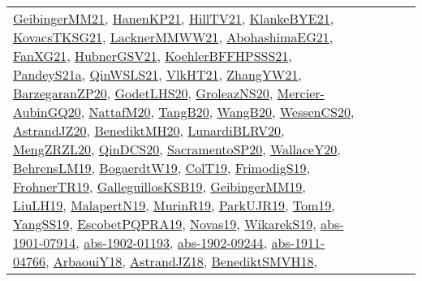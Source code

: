 {\begin{longtable}{lp{3cm}>{\raggedright}p{6cm}>{\raggedright}p{6cm}p{8cm}}
\href{papers/GeibingerMM21.pdf}{GeibingerMM21}\cite{GeibingerMM21}, \href{papers/HanenKP21.pdf}{HanenKP21}\cite{HanenKP21}, \href{papers/HillTV21.pdf}{HillTV21}\cite{HillTV21}, \href{papers/KlankeBYE21.pdf}{KlankeBYE21}\cite{KlankeBYE21}, \href{papers/KovacsTKSG21.pdf}{KovacsTKSG21}\cite{KovacsTKSG21}, \href{papers/LacknerMMWW21.pdf}{LacknerMMWW21}\cite{LacknerMMWW21}, \href{articles/AbohashimaEG21.pdf}{AbohashimaEG21}\cite{AbohashimaEG21}, \href{articles/FanXG21.pdf}{FanXG21}\cite{FanXG21}, \href{articles/HubnerGSV21.pdf}{HubnerGSV21}\cite{HubnerGSV21}, \href{articles/KoehlerBFFHPSSS21.pdf}{KoehlerBFFHPSSS21}\cite{KoehlerBFFHPSSS21}, \href{articles/PandeyS21a.pdf}{PandeyS21a}\cite{PandeyS21a}, \href{articles/QinWSLS21.pdf}{QinWSLS21}\cite{QinWSLS21}, \href{articles/VlkHT21.pdf}{VlkHT21}\cite{VlkHT21}, \href{articles/ZhangYW21.pdf}{ZhangYW21}\cite{ZhangYW21}, \href{papers/BarzegaranZP20.pdf}{BarzegaranZP20}\cite{BarzegaranZP20}, \href{papers/GodetLHS20.pdf}{GodetLHS20}\cite{GodetLHS20}, \href{papers/GroleazNS20.pdf}{GroleazNS20}\cite{GroleazNS20}, \href{papers/Mercier-AubinGQ20.pdf}{Mercier-AubinGQ20}\cite{Mercier-AubinGQ20}, \href{papers/NattafM20.pdf}{NattafM20}\cite{NattafM20}, \href{papers/TangB20.pdf}{TangB20}\cite{TangB20}, \href{papers/WangB20.pdf}{WangB20}\cite{WangB20}, \href{papers/WessenCS20.pdf}{WessenCS20}\cite{WessenCS20}, \href{articles/AstrandJZ20.pdf}{AstrandJZ20}\cite{AstrandJZ20}, \href{articles/BenediktMH20.pdf}{BenediktMH20}\cite{BenediktMH20}, \href{articles/LunardiBLRV20.pdf}{LunardiBLRV20}\cite{LunardiBLRV20}, \href{articles/MengZRZL20.pdf}{MengZRZL20}\cite{MengZRZL20}, \href{articles/QinDCS20.pdf}{QinDCS20}\cite{QinDCS20}, \href{articles/SacramentoSP20.pdf}{SacramentoSP20}\cite{SacramentoSP20}, \href{articles/WallaceY20.pdf}{WallaceY20}\cite{WallaceY20}, \href{papers/BehrensLM19.pdf}{BehrensLM19}\cite{BehrensLM19}, \href{papers/BogaerdtW19.pdf}{BogaerdtW19}\cite{BogaerdtW19}, \href{papers/ColT19.pdf}{ColT19}\cite{ColT19}, \href{papers/FrimodigS19.pdf}{FrimodigS19}\cite{FrimodigS19}, \href{papers/FrohnerTR19.pdf}{FrohnerTR19}\cite{FrohnerTR19}, \href{papers/GalleguillosKSB19.pdf}{GalleguillosKSB19}\cite{GalleguillosKSB19}, \href{papers/GeibingerMM19.pdf}{GeibingerMM19}\cite{GeibingerMM19}, \href{papers/LiuLH19.pdf}{LiuLH19}\cite{LiuLH19}, \href{papers/MalapertN19.pdf}{MalapertN19}\cite{MalapertN19}, \href{papers/MurinR19.pdf}{MurinR19}\cite{MurinR19}, \href{papers/ParkUJR19.pdf}{ParkUJR19}\cite{ParkUJR19}, \href{papers/Tom19.pdf}{Tom19}\cite{Tom19}, \href{papers/YangSS19.pdf}{YangSS19}\cite{YangSS19}, \href{articles/EscobetPQPRA19.pdf}{EscobetPQPRA19}\cite{EscobetPQPRA19}, \href{articles/Novas19.pdf}{Novas19}\cite{Novas19}, \href{articles/WikarekS19.pdf}{WikarekS19}\cite{WikarekS19}, \href{articles/abs-1901-07914.pdf}{abs-1901-07914}\cite{abs-1901-07914}, \href{articles/abs-1902-01193.pdf}{abs-1902-01193}\cite{abs-1902-01193}, \href{articles/abs-1902-09244.pdf}{abs-1902-09244}\cite{abs-1902-09244}, \href{articles/abs-1911-04766.pdf}{abs-1911-04766}\cite{abs-1911-04766}, \href{papers/ArbaouiY18.pdf}{ArbaouiY18}\cite{ArbaouiY18}, \href{papers/AstrandJZ18.pdf}{AstrandJZ18}\cite{AstrandJZ18}, \href{papers/BenediktSMVH18.pdf}{BenediktSMVH18}\cite{BenediktSMVH18}, 
\end{longtable}}
